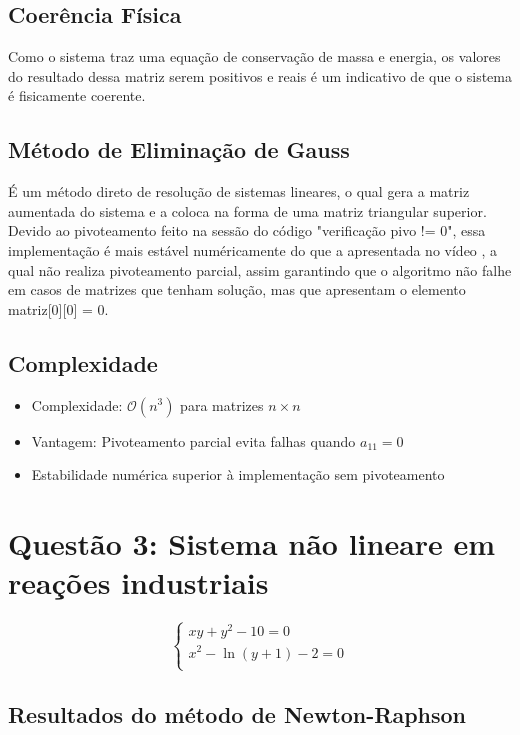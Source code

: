 \documentclass{article}
\begin{document}
\subsection*{Coerência Física}
Como o sistema traz uma equação de conservação de massa e energia, os valores do resultado dessa matriz serem positivos e reais é um indicativo de que o sistema é fisicamente coerente.

\subsection*{Método de Eliminação de Gauss}
É um método direto de resolução de sistemas lineares, o qual gera a matriz aumentada do sistema e a coloca na forma de uma matriz triangular superior. Devido ao pivoteamento feito na sessão do código "verificação pivo != 0", essa implementação é mais estável numéricamente do que a apresentada no vídeo \cite{Gauss}, a qual não realiza 
pivoteamento parcial, assim garantindo que o algoritmo não falhe em casos de matrizes que tenham solução, mas que apresentam o elemento matriz[0][0] = 0.

\subsection*{Complexidade}
\begin{itemize}
\item Complexidade: $\mathcal{O}(n^3)$ para matrizes $n \times n$
\item Vantagem: Pivoteamento parcial evita falhas quando $a_{11} = 0$
\item Estabilidade numérica superior à implementação sem pivoteamento
\end{itemize}


\section*{Questão 3: Sistema não lineare em reações industriais}
\begin{equation}\label{eq:sistema}
\begin{cases}
xy + y^2 - 10 = 0 \\
x^2 - \ln(y+1) - 2 = 0 \\
\end{cases}
\end{equation}

\subsection*{Resultados do método de Newton-Raphson}
\end{document}
